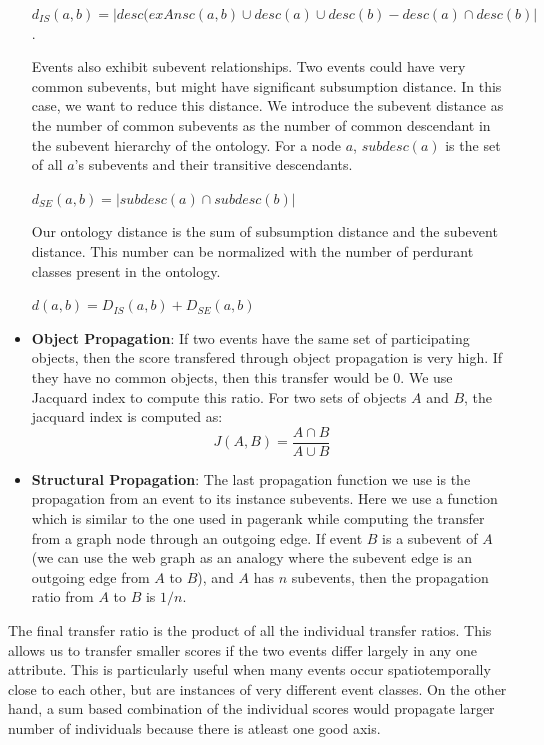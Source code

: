 \begin{itemize}
$d_{IS}(a, b) = |desc(exAnsc(a, b) \cup desc(a) \cup desc(b) - desc(a) \cap desc(b)|$.

Events also exhibit subevent relationships. Two events could have very common subevents, but might have significant subsumption distance. In this case, we want to reduce this distance. We introduce the subevent distance as the number of common subevents as the number of common descendant in the subevent hierarchy of the ontology. For a node $a$, $subdesc(a)$ is the set of all $a$'s subevents and their transitive descendants.

$d_{SE}(a, b) = |subdesc(a) \cap subdesc(b)|$

Our ontology distance is the sum of subsumption distance and the subevent distance. This number can be normalized with the number of perdurant classes present in the ontology.

$d(a, b) = D_{IS}(a, b) + D_{SE}(a, b)$

\item \textbf{Object Propagation}: If two events have the same set of participating objects, then the score transfered through object propagation is very high. If they have no common objects, then this transfer would be 0. We use Jacquard index to compute this ratio. For two sets of objects $A$ and $B$, the jacquard index is computed as:
\begin{equation}
J(A, B) = \frac{A \cap B}{A \cup B} \nonumber
\end{equation}

\item \textbf{Structural Propagation}: The last propagation function we use is the propagation from an event to its instance subevents. Here we use a function which is similar to the one used in pagerank while computing the transfer from a graph node through an outgoing edge. If event $B$ is a subevent of $A$ (we can use the web graph as an analogy where the subevent edge is an outgoing edge from $A$ to $B$), and $A$ has $n$ subevents, then the propagation ratio from $A$ to $B$ is $1/n$.

\end{itemize}

The final transfer ratio is the product of all the individual transfer ratios. This allows us to transfer smaller scores if the two events differ largely in any one attribute. This is particularly useful when many events occur spatiotemporally close to each other, but are instances of very different event classes. On the other hand, a sum based combination of the individual scores would propagate larger number of individuals because there is atleast one good axis.

